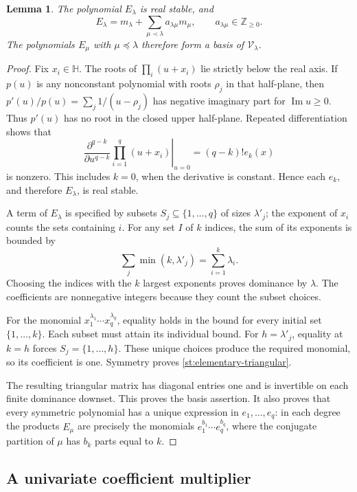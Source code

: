 \documentclass[reqno, 12pt]{article}
\numberwithin{equation}{section}
\newtheorem{lemma}[theorem]{Lemma}
\theoremstyle{definition}
\newcommand{\NN}{\mathbb Z_{\geq0}}
\begin{document}
\begin{lemma}\label{st:elementary-unitriangular}
The polynomial $E_\lambda$ is real stable, and
\begin{equation}\label{st:elementary-triangular}
E_\lambda=m_\lambda+
 \sum_{\mu\prec\lambda}a_{\lambda\mu}m_\mu,
\qquad a_{\lambda\mu}\in\NN.
\end{equation}
The polynomials $E_\mu$ with $\mu\preceq\lambda$ therefore form
a basis of $\mathcal V_\lambda$.
\end{lemma}
\begin{proof}
Fix $x_i\in\mathbb H$.  The roots of $\prod_i(u+x_i)$ lie
strictly below the real axis.  If $p(u)$ is any nonconstant polynomial with roots $\rho_j$ in that half-plane, then
$p'(u)/p(u)=\sum_j1/(u-\rho_j)$ has negative imaginary part for $\operatorname{Im}u\geq0$.  Thus $p'(u)$ has no root in
the closed upper half-plane.  Repeated differentiation shows that
\[
\left.\frac{\partial^{q-k}}{\partial u^{q-k}}
\prod_{i=1}^q(u+x_i)\right|_{u=0}
=(q-k)!e_k(x)
\]
is nonzero.  This includes $k=0$, when the derivative is constant.
Hence each $e_k$, and therefore $E_\lambda$, is real stable.

A term of $E_\lambda$ is specified by subsets
$S_j\subseteq\{1,\ldots,q\}$ of sizes $\lambda'_j$; the
exponent of $x_i$ counts the sets containing $i$.  For any set
$I$ of $k$ indices, the sum of its exponents is bounded by
\[
\sum_j\min(k,\lambda'_j)=\sum_{i=1}^k\lambda_i.
\]
Choosing the indices with the $k$ largest exponents proves
dominance by $\lambda$.  The coefficients are nonnegative integers
because they count the subset choices.

For the monomial $x_1^{\lambda_1}\cdots x_q^{\lambda_q}$,
equality holds in the bound for every initial set
$\{1,\ldots,k\}$.  Each subset must attain its individual bound.
For $h=\lambda'_j$, equality at $k=h$ forces
$S_j=\{1,\ldots,h\}$.  These unique choices produce the required
monomial, so its coefficient is one.  Symmetry proves
\eqref{st:elementary-triangular}.

The resulting triangular matrix has diagonal entries one and is
invertible on each finite dominance downset.  This proves the basis
assertion.  It also proves that every symmetric polynomial has a
unique expression in $e_1,\ldots,e_q$: in each degree the products
$E_\mu$ are precisely the monomials $e_1^{b_1}\cdots e_q^{b_q}$,
where the conjugate partition of $\mu$ has $b_k$ parts equal to $k$.
\end{proof}


\subsection{A univariate coefficient multiplier}
\end{document}
